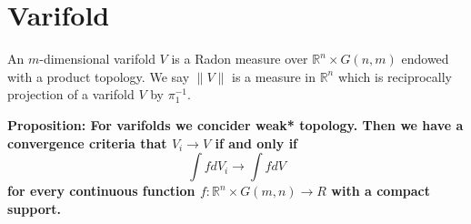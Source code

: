 \documentclass{article}
\begin{document}
\section{Varifold}

An $m$-dimensional varifold $V$ is a Radon measure over $\mathbb{R}^n\times
G(n,m)$ endowed with a product topology. We say $\|V\|$ is a measure in
$\mathbb{R}^n$ which is reciprocally projection of a varifold $V$ by $\pi_1^{-1}$.

\textbf{Proposition: For varifolds we concider weak* topology. Then we have a
convergence criteria that $V_i\rightarrow V$ if and only if
\[\int fdV_i\rightarrow\int fdV\]
for every continuous function $f:\mathbb{R}^n\times G(m,n)\rightarrow R$ with a
compact support.}
\vspace{1ex}
\end{document}
